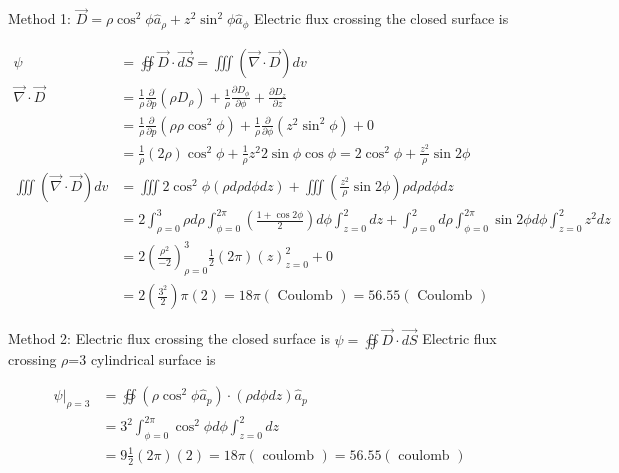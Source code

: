 \documentclass[11pt,a4paper]{article}
\begin{document}
\begin{tcolorbox}[solbox, title=Detailed Solution -- Question 26]
Method 1: $\vec{D}=\rho \cos ^{2} \phi \hat{a}_{\rho}+z^{2} \sin ^{2} \phi \hat{a}_{\phi}$
 Electric flux crossing the closed surface is

\[
\begin{aligned} \psi &=\oiint \vec{D} \cdot \overrightarrow{d S}=\iiint(\vec{\nabla} \cdot \vec{D}) d v \\ \vec{\nabla} \cdot \vec{D} &=\frac{1}{\rho} \frac{\partial}{\partial p}\left(\rho D_{\rho}\right)+\frac{1}{\rho} \frac{\partial D_{\phi}}{\partial \phi}+\frac{\partial D_{z}}{\partial z} \\ &=\frac{1}{\rho} \frac{\partial}{\partial p}\left(\rho \rho \cos ^{2} \phi\right)+\frac{1}{\rho} \frac{\partial}{\partial \phi}\left(z^{2} \sin ^{2} \phi\right)+0 \\ &=\frac{1}{\rho}(2 \rho) \cos ^{2} \phi+\frac{1}{\rho} z^{2} 2 \sin \phi \cos \phi=2 \cos ^{2} \phi+\frac{z^{2}}{\rho} \sin 2 \phi\\ \iiint(\vec{\nabla} \cdot \vec{D}) d v &=\iiint 2 \cos ^{2} \phi(\rho d \rho d \phi d z)+\iiint\left(\frac{z^{2}}{\rho} \sin 2 \phi\right) \rho d \rho d \phi d z \\ &=2 \int_{\rho=0}^{3} \rho d \rho \int_{\phi=0}^{2 \pi}\left(\frac{1+\cos 2 \phi}{2}\right) d \phi \int_{z=0}^{2} d z+\int_{\rho=0}^{2} d \rho \int_{\phi=0}^{2 \pi} \sin 2 \phi d \phi \int_{z=0}^{2} z^{2} d z \\ &=2\left(\frac{\rho^{2}}{-2}\right)_{\rho=0}^{3} \frac{1}{2}(2 \pi)(z)_{z=0}^{2}+0 \\ &=2\left(\frac{3^{2}}{2}\right) \pi(2)=18 \pi(\text { Coulomb })=56.55(\text { Coulomb }) \end{aligned}
\]

Method 2: Electric flux crossing the closed surface is
$\psi=\oiint \vec{D} \cdot \overrightarrow{d S}$
 Electric flux crossing $\rho$=3 cylindrical surface is

\[
\begin{aligned} \left.\psi\right|_{\rho=3} &=\oiint\left(\rho \cos ^{2} \phi \hat{a}_{p}\right) \cdot(\rho d \phi d z) \hat{a}_{p} \\ &=3^{2} \int_{\phi=0}^{2 \pi} \cos ^{2} \phi d \phi \int_{z=0}^{2} d z \\ &=9 \frac{1}{2}(2 \pi)(2)=18 \pi(\text { coulomb })=56.55(\text { coulomb }) \end{aligned}
\]
\end{tcolorbox}
\end{document}
